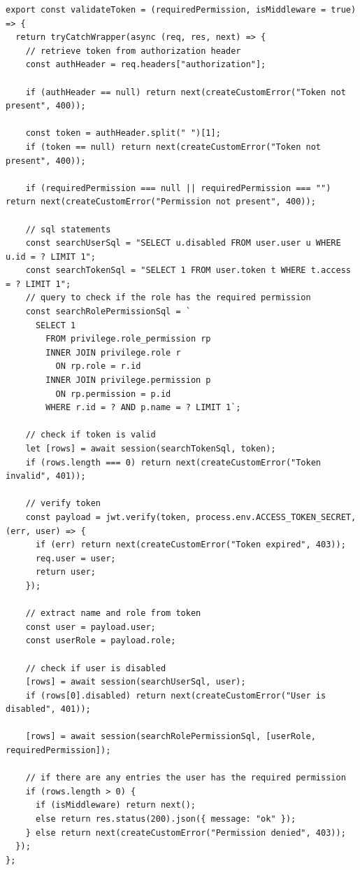 \documentclass[
    headings=optiontotocandhead,%
    twoside,
    numbers=noenddot,%
    12pt, %
    titlepage, %
    parskip=full, %
    listof=leveldown, 
    numbers=noenddot, %
    a4paper,DIV=14,
    BCOR=15mm,
]{scrbook}
\begin{document}
\begin{lstlisting}[caption={Validate Token Funktion}]
export const validateToken = (requiredPermission, isMiddleware = true) => {
  return tryCatchWrapper(async (req, res, next) => {
    // retrieve token from authorization header
    const authHeader = req.headers["authorization"];

    if (authHeader == null) return next(createCustomError("Token not present", 400));
  
    const token = authHeader.split(" ")[1];
    if (token == null) return next(createCustomError("Token not present", 400));

    if (requiredPermission === null || requiredPermission === "") return next(createCustomError("Permission not present", 400));

    // sql statements
    const searchUserSql = "SELECT u.disabled FROM user.user u WHERE u.id = ? LIMIT 1";
    const searchTokenSql = "SELECT 1 FROM user.token t WHERE t.access = ? LIMIT 1";
    // query to check if the role has the required permission
    const searchRolePermissionSql = `
      SELECT 1
        FROM privilege.role_permission rp
        INNER JOIN privilege.role r
          ON rp.role = r.id
        INNER JOIN privilege.permission p
          ON rp.permission = p.id
        WHERE r.id = ? AND p.name = ? LIMIT 1`;

    // check if token is valid
    let [rows] = await session(searchTokenSql, token);
    if (rows.length === 0) return next(createCustomError("Token invalid", 401));

    // verify token
    const payload = jwt.verify(token, process.env.ACCESS_TOKEN_SECRET, (err, user) => {
      if (err) return next(createCustomError("Token expired", 403));
      req.user = user;
      return user;
    });

    // extract name and role from token
    const user = payload.user;
    const userRole = payload.role;

    // check if user is disabled
    [rows] = await session(searchUserSql, user);
    if (rows[0].disabled) return next(createCustomError("User is disabled", 401));

    [rows] = await session(searchRolePermissionSql, [userRole, requiredPermission]);

    // if there are any entries the user has the required permission
    if (rows.length > 0) {
      if (isMiddleware) return next();
      else return res.status(200).json({ message: "ok" });
    } else return next(createCustomError("Permission denied", 403)); 
  });
};
\end{lstlisting}
\end{document}
